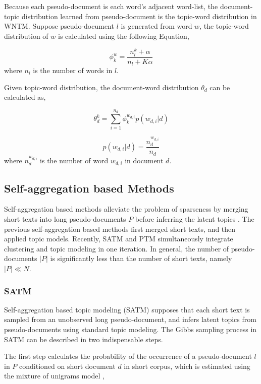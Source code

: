 \documentclass[10pt,journal,compsoc]{IEEEtran}
\begin{document}
{Because each pseudo-document is each word's adjacent word-list, the document-topic distribution learned from pseudo-document is the topic-word distribution in WNTM. Suppose pseudo-document $l$ is generated from word $w$, the topic-word distribution of $w$ is calculated using the following Equation,

\begin{equation}
\phi_k^w=\frac{n_l^k+\alpha}{n_l+K\alpha}
\end{equation}
where $n_l$ is the number of words in $l$.

Given topic-word distribution, the document-word distribution $\theta_d$ can be calculated as,

\[
\theta_d^k=\sum_{i=1}^{n_d}\phi_k^{w_{d,i}}p(w_{d,i}|d)
\]

\[
p(w_{d,i}|d)=\frac{n_d^{w_{d,i}}}{n_d}
\]
where $n_d^{w_{d,i}}$ is the number of word $w_{d,i}$ in document $d$.

\subsection{Self-aggregation based Methods}

Self-aggregation based methods alleviate the problem of sparseness by merging short texts into long pseudo-documents $P$ before inferring the latent topics \cite{jin2011transferring,qiang2017topic,mehrotra2013improving}. The previous self-aggregation based methods first merged short texts, and then applied topic models. Recently, SATM and PTM simultaneously integrate clustering and topic modeling in one iteration. In general, the number of pseudo-documents $|P|$ is significantly less than the number of short texts, namely $|P| \ll N$.

\subsubsection{SATM}

Self-aggregation based topic modeling (SATM) \cite{quan2015short} supposes that each short text is sampled from an unobserved long pseudo-document, and infers latent topics from pseudo-documents using standard topic modeling. The Gibbs sampling process in SATM can be described in two indispensable steps.

The first step calculates the probability of the occurrence of a pseudo-document $l$ in $P$ conditioned on short document $d$ in short corpus, which is estimated using the mixture of unigrams model \cite{nigam2000text},

}
\end{document}
